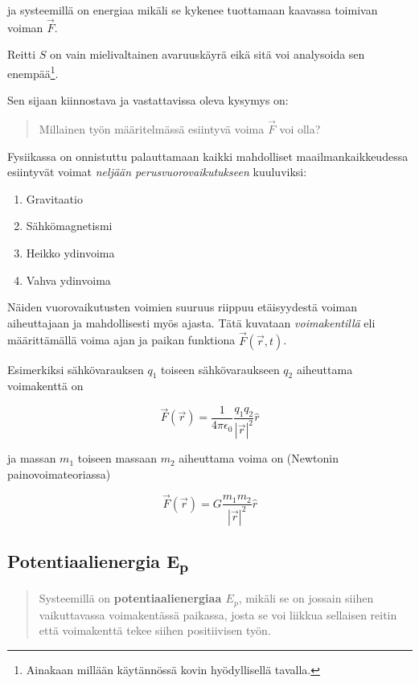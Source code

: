 \documentclass[12pt,a4paper,finnish]{book}
\begin{document}
ja systeemillä on energiaa mikäli se kykenee tuottamaan kaavassa toimivan voiman $\vec{F}$.

Reitti $S$ on vain mielivaltainen avaruuskäyrä eikä sitä voi analysoida sen enempää\footnote{
Ainakaan millään käytännössä kovin hyödyllisellä tavalla.}.

Sen sijaan kiinnostava ja vastattavissa oleva kysymys on:

\begin{quote}
 Millainen työn määritelmässä esiintyvä voima $\vec{F}$ voi olla? 
\end{quote}

Fysiikassa on onnistuttu palauttamaan kaikki mahdolliset maailmankaikkeudessa esiintyvät voimat 
\textit{neljään perusvuorovaikutukseen} kuuluviksi:

\begin{enumerate}
 \item Gravitaatio
 \item Sähkömagnetismi
 \item Heikko ydinvoima
 \item Vahva ydinvoima
\end{enumerate}

Näiden vuorovaikutusten voimien suuruus riippuu etäisyydestä voiman aiheuttajaan ja mahdollisesti myös ajasta. 
Tätä kuvataan \textit{voimakentillä} eli määrittämällä voima ajan ja paikan funktiona $\vec{F}(\vec{r}, t)$. 

Esimerkiksi sähkövarauksen $q_1$ toiseen sähkövaraukseen $q_2$ aiheuttama voimakenttä on

\begin{equation}
 \vec{F}(\vec{r}) = \frac{1}{4\pi\epsilon_0}\frac{q_1q_2}{|\vec{r}|^2}\hat{r}
\end{equation}

ja massan $m_1$ toiseen massaan $m_2$ aiheuttama voima on (Newtonin painovoimateoriassa)

\begin{equation}
 \vec{F}(\vec{r}) = G\frac{m_1m_2}{|\vec{r}|^2}\hat{r}
\end{equation}

\subsection{Potentiaalienergia E\textsubscript{p}}

\begin{quotation}
Systeemillä on \textbf{potentiaalienergiaa $E_p$}, mikäli se on jossain siihen vaikuttavassa voimakentässä 
paikassa, josta se voi liikkua sellaisen reitin että voimakenttä tekee siihen positiivisen työn.
\end{quotation}
\end{document}
